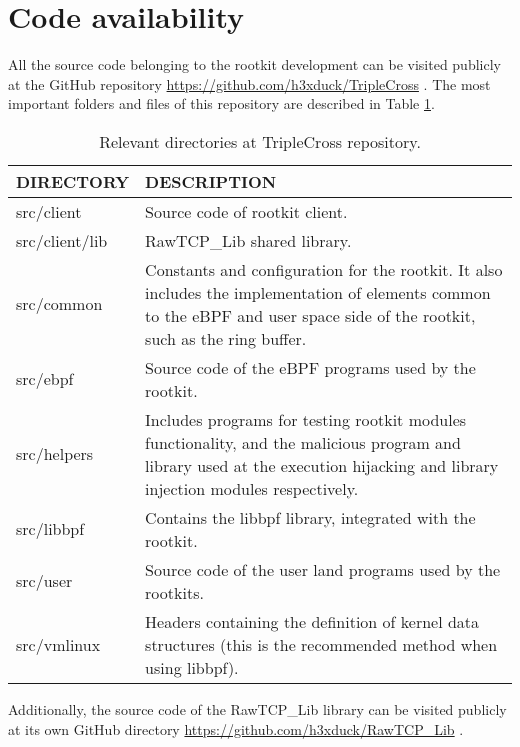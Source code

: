 \section{Code availability}
All the source code belonging to the rootkit development can be visited publicly at the GitHub repository \url{https://github.com/h3xduck/TripleCross} \cite{triplecross_github}. The most important folders and files of this repository are described in Table \ref{table:triplecross_dirs}.

\begin{table}[htbp]
\begin{tabular}{|>{\centering\arraybackslash}p{4cm}|>{\centering\arraybackslash}p{10cm}|}
\hline
\textbf{DIRECTORY} & \textbf{DESCRIPTION}\\
\hline
\hline
src/client & Source code of rootkit client.\\
\hline
src/client/lib & RawTCP\_Lib shared library.\\
\hline
src/common & Constants and configuration for the rootkit. It also includes the implementation of elements common to the eBPF and user space side of the rootkit, such as the ring buffer.\\
\hline
src/ebpf & Source code of the eBPF programs used by the rootkit.\\
\hline
src/helpers & Includes programs for testing rootkit modules functionality, and the malicious program and library used at the execution hijacking and library injection modules respectively.\\
\hline
src/libbpf & Contains the libbpf library, integrated with the rootkit.\\
\hline
src/user & Source code of the user land programs used by the rootkits.\\
\hline
src/vmlinux & Headers containing the definition of kernel data structures (this is the recommended method when using libbpf).\\
\hline
\end{tabular}
\caption{Relevant directories at TripleCross repository.}
\label{table:triplecross_dirs}
\end{table} 

Additionally, the source code of the RawTCP\_Lib library can be visited publicly at its own GitHub directory \url{https://github.com/h3xduck/RawTCP_Lib} \cite{rawtcp_lib}.

